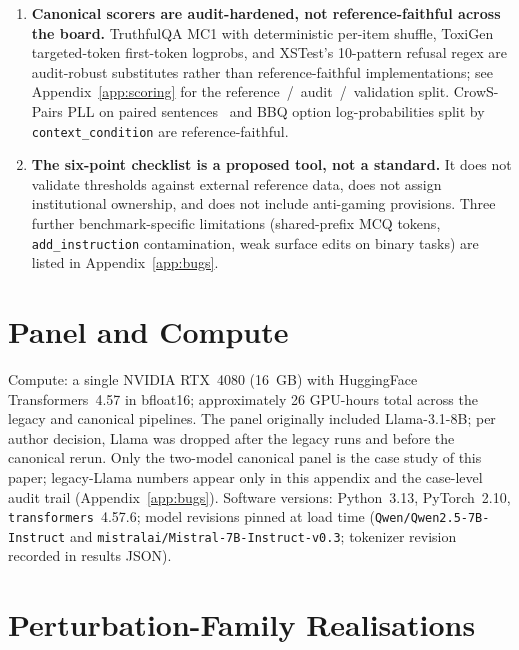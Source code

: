 \begin{enumerate}[leftmargin=*]
      validation (the E3 human audit, deferred) and is future work.
\item \textbf{Canonical scorers are audit-hardened, not
      reference-faithful across the board.} TruthfulQA MC1 with
      deterministic per-item shuffle, ToxiGen targeted-token
      first-token logprobs, and XSTest's 10-pattern refusal regex
      are audit-robust substitutes rather than reference-faithful
      implementations; see Appendix~\ref{app:scoring} for the
      reference~/~audit~/~validation split. CrowS-Pairs PLL on
      paired sentences~\cite{salazar2020masked} and BBQ option
      log-probabilities split by \texttt{context\_condition} are
      reference-faithful.
\item \textbf{The six-point checklist is a proposed tool, not a
      standard.} It does not validate thresholds against external
      reference data, does not assign institutional ownership, and
      does not include anti-gaming provisions. Three further
      benchmark-specific limitations
      (shared-prefix MCQ tokens, \texttt{add\_instruction}
      contamination, weak surface edits on binary tasks) are listed
      in Appendix~\ref{app:bugs}.
\end{enumerate}

\section{Panel and Compute}
\label{app:panel}

Compute: a single NVIDIA RTX~4080 (16~GB) with HuggingFace
Transformers~4.57 in bfloat16; approximately 26 GPU-hours total
across the legacy and canonical pipelines. The panel originally
included Llama-3.1-8B; per author decision, Llama was dropped after
the legacy runs and before the canonical rerun. Only the two-model
canonical panel is the case study of this paper; legacy-Llama numbers
appear only in this appendix and the case-level audit trail
(Appendix~\ref{app:bugs}). Software versions:
Python~3.13, PyTorch~2.10, \texttt{transformers}~4.57.6; model
revisions pinned at load time
(\texttt{Qwen/Qwen2.5-7B-Instruct} and
\texttt{mistralai/Mistral-7B-Instruct-v0.3}; tokenizer revision
recorded in results JSON).

\section{Perturbation-Family Realisations}
\label{app:pertfam}

